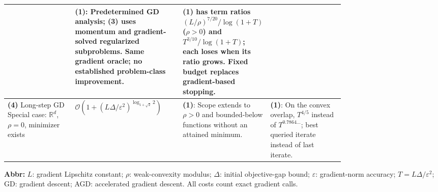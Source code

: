 \begin{table}[tp]
\begin{threeparttable}
\begin{tabularx}{\linewidth}{@{}>{\raggedright\arraybackslash}p{0.20\linewidth}>{\raggedright\arraybackslash}p{0.32\linewidth}>{\raggedright\arraybackslash}p{0.25\linewidth}>{\raggedright\arraybackslash}X@{}}
& \textbf{(1)}: Predetermined GD analysis; \textbf{(3)} uses momentum and gradient-solved regularized subproblems. Same gradient oracle; no established problem-class improvement.
& \textbf{(1)} has term ratios $(L/\rho)^{7/20}/\log(1+T)$ ($\rho>0$) and $T^{3/10}/\log(1+T)$; each loses when its ratio grows. Fixed budget replaces gradient-based stopping. \\
\midrule
\textbf{(4)} Long-step GD \citep[Theorem~1]{swcGrimmer2024v4}\newline Special case: $\mathbb{R}^d$, $\rho=0$, minimizer exists
& $\mathcal{O}\!\left(1+(L\Delta/\varepsilon^2)^{\log_{1+\sqrt2}2}\right)$
& \textbf{(1)}: Scope extends to $\rho>0$ and bounded-below functions without an attained minimum.
& \textbf{(1)}: On the convex overlap, $T^{4/5}$ instead of $T^{0.7864\ldots}$; best queried iterate instead of last iterate. \\
\bottomrule
\end{tabularx}
\begin{tablenotes}[flushleft]\footnotesize
\item[] \textbf{Abbr:} $L$: gradient Lipschitz constant; $\rho$: weak-convexity modulus; $\Delta$: initial objective-gap bound; $\varepsilon$: gradient-norm accuracy; $T=L\Delta/\varepsilon^2$; GD: gradient descent; AGD: accelerated gradient descent. All costs count exact gradient calls.
\end{tablenotes}
\end{threeparttable}
\end{table}
